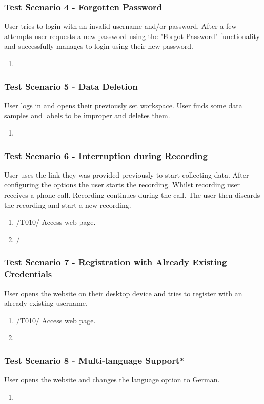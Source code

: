 \subsubsection{Test Scenario 4 - Forgotten Password}
User tries to login with an invalid username and/or password. After a few attempts user requests a new password using the "Forgot Password" functionality and successfully manages to login using their new password.
\begin{enumerate}
    \item 
\end{enumerate} 
\subsubsection{Test Scenario 5 - Data Deletion} 
User logs in and opens their previously set workspace. User finds some data samples and labels to be improper and deletes them.
\begin{enumerate}
    \item 
\end{enumerate}
\subsubsection{Test Scenario 6 - Interruption during Recording}
User uses the link they was provided previously to start collecting data. After configuring the options the user starts the recording. Whilst recording user receives a phone call. Recording continues during the call. The user then discards the recording and start a new recording. 
\begin{enumerate}
    \item /T010/ Access web page.
    \item /
\end{enumerate}
\subsubsection{Test Scenario 7 - Registration with Already Existing Credentials}
User opens the website on their desktop device and tries to register with an already existing username.
\begin{enumerate}
    \item /T010/ Access web page.
    \item 
\end{enumerate}
\subsubsection{Test Scenario 8 - Multi-language Support*}
User opens the website and changes the language option to German. 
\begin{enumerate}
    \item 
\end{enumerate}
